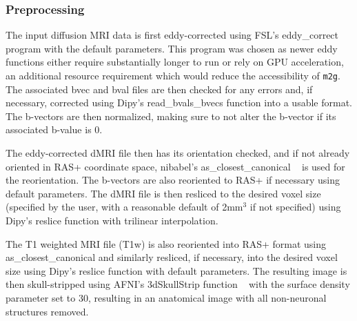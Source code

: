 \subsubsection{Preprocessing}
The input diffusion MRI data is first eddy-corrected using FSL's eddy\_correct \cite{dipy} program with the default parameters. This program was chosen as newer eddy functions either require substantially longer to run or rely on GPU acceleration, an additional resource requirement which would reduce the accessibility of \texttt{m2g}. The associated bvec and bval files are then checked for any errors and, if necessary, corrected using Dipy's read\_bvals\_bvecs function \cite{dipy} into a usable format. The b-vectors are then normalized, making sure to not alter the b-vector if its associated b-value is 0.

The eddy-corrected dMRI file then has its orientation checked, and if not already oriented in RAS+ coordinate space, nibabel's as\_closest\_canonical ~\cite{nibable} is used for the reorientation. The b-vectors are also reoriented to RAS+ if necessary using default parameters. The dMRI file is then resliced to the desired voxel size (specified by the user, with a reasonable default of 2mm$^3$ if not specified) using Dipy's reslice function with trilinear interpolation\cite{dipy}.

The T1 weighted MRI file (T1w) is also reoriented into RAS+ format using as\_closest\_canonical and similarly resliced, if necessary, into the desired voxel size using Dipy's reslice function \cite{dipy} with default parameters. The resulting image is then skull-stripped using AFNI's 3dSkullStrip function ~\cite{AFNI} with the surface density parameter set to 30, resulting in an anatomical image with all non-neuronal structures removed.

